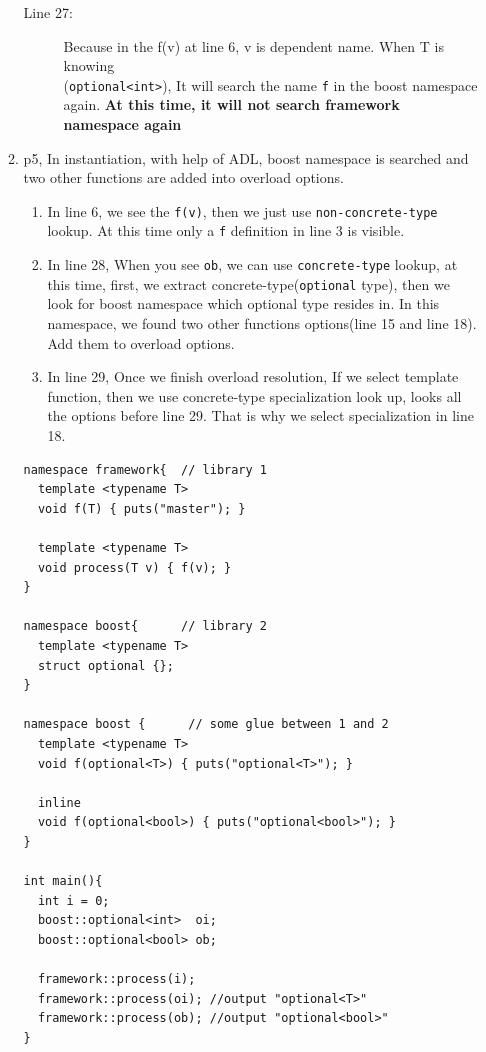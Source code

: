 \documentclass[a4paper,11pt,twoside]{book}
\begin{document}
\begin{itemize}
\begin{enumerate}
\begin{description}
	 \item[Line 27:] Because in the f(v) at line 6, v is dependent name. When T is knowing \\ (\texttt{optional<int>}), It will search the name \texttt{f} in the boost namespace again.  \textbf{At this time, it will not search framework namespace again}
\end{description}


\item p5, In instantiation, with help of ADL, boost namespace is searched and two other functions are added into overload options.
\begin{enumerate}
	\item In line 6, we see the \texttt{f(v)}, then we just use \texttt{non-concrete-type} lookup. At this time only a \texttt{f} definition in line 3 is visible.
	
	\item In line 28, When you see \texttt{ob}, we can use \texttt{concrete-type} lookup, at this time, first, we extract concrete-type(\texttt{optional} type), then we look for boost namespace which optional type resides in. In this namespace, we found two other functions options(line 15 and line 18). Add them to overload options. 
	
	\item In line 29, Once we finish overload resolution, If we select template function, then we use concrete-type specialization look up, looks all the options before line 29. That is why we select specialization in line 18.
\end{enumerate}	

\begin{lstlisting}[]
namespace framework{  // library 1
  template <typename T>
  void f(T) { puts("master"); }
 
  template <typename T>
  void process(T v) { f(v); } 
}
 
namespace boost{      // library 2
  template <typename T>
  struct optional {};
}
 
namespace boost {      // some glue between 1 and 2
  template <typename T>
  void f(optional<T>) { puts("optional<T>"); }
    
  inline
  void f(optional<bool>) { puts("optional<bool>"); }
}
 
int main(){
  int i = 0;
  boost::optional<int>  oi;
  boost::optional<bool> ob;
  
  framework::process(i);
  framework::process(oi); //output "optional<T>"
  framework::process(ob); //output "optional<bool>"
}
\end{lstlisting}




\end{enumerate}
\end{itemize}
\end{document}
